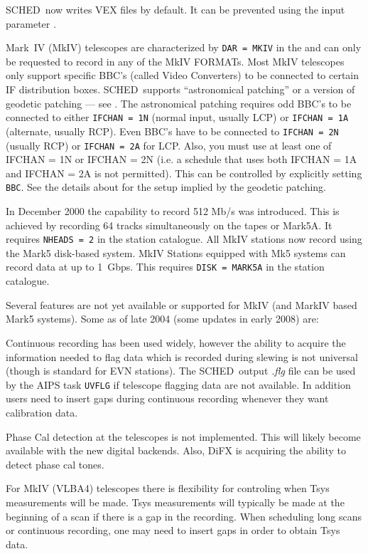 \documentclass{report}
\newcommand{\schedb}{{\sc SCHED~}}
\begin{document}
\schedb now writes VEX files by default.  It can be prevented using
the input parameter .

Mark~IV (MkIV) telescopes are characterized by {\tt DAR = MKIV} in the
 and can only be requested to
record in any of the MkIV FORMATs. Most MkIV telescopes only support
specific BBC's (called Video Converters) to be connected to certain IF
distribution boxes. \schedb supports ``astronomical patching'' or a
version of geodetic patching --- see . The astronomical patching requires odd BBC's to
be connected to either {\tt IFCHAN = 1N} (normal input, usually LCP)
or {\tt IFCHAN = 1A} (alternate, usually RCP). Even BBC's have to be
connected to {\tt IFCHAN = 2N} (usually RCP) or {\tt IFCHAN = 2A} for
LCP.  Also, you must use at least one of IFCHAN = 1N or IFCHAN = 2N
(i.e. a schedule that uses both IFCHAN = 1A and IFCHAN = 2A is not
permitted).  This can be controlled by explicitly setting {\tt BBC}.
See the details about  for the setup
implied by the geodetic patching.

In December 2000 the capability to record 512 Mb/s was introduced.
This is achieved by recording 64 tracks simultaneously on the tapes or
Mark5A.  It requires {\tt NHEADS = 2} in the station catalogue. All
MkIV stations now record using the Mark5 disk-based system. MkIV
Stations equipped with Mk5 systems can record data at up to
1~Gbps. This requires {\tt DISK = MARK5A} in the station catalogue.

Several features are not yet available or supported for MkIV (and MarkIV
based Mark5 systems).  Some as of late 2004 (some updates in early 2008)
are:

\begin{list}{}{\parsep 0em  \itemsep 0em }

\item Continuous recording has been used widely, however the ability
  to acquire the information needed to flag data which is recorded during
  slewing is not universal (though is standard for EVN stations).
  The \schedb output {\sl .flg} file can be used by the AIPS task
  {\tt UVFLG} if telescope flagging data are not available.  In addition
  users need to insert gaps during continuous recording whenever they
  want calibration data.

\item Phase Cal detection at the telescopes is not implemented.
  This will likely become available with the new digital backends.
  Also, DiFX is acquiring the ability to detect phase cal tones.

\item For MkIV (VLBA4) telescopes there is flexibility for controling
  when Tsys measurements will be made. Tsys measurements will typically
  be made at the beginning of a scan if there is a gap in the recording.
  When scheduling long scans or continuous recording, one may need to
  insert gaps in order to obtain Tsys data.

\end{list}
\end{document}
